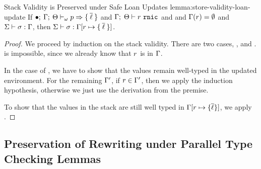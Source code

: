 \begin{oxlemma}{Stack Validity is Preserved under Safe Loan Updates}
  {lemma:store-validity-loan-update} If
  $\bullet; \: \Gamma; \: \Theta \vdash_{\omega} p \Rightarrow 
    \{ \: \overline{\ell} \: \} $ and
  $\Gamma; \; \Theta \vdash r \ \mathtt{rnic}$ and
  and $\Gamma(r) = \emptyset$ and
  $\Sigma \vdash \sigma : \Gamma$, then
  $\Sigma \vdash \sigma :  \Gamma [
      r \mapsto \{ \: \overline{\ell} \: \} ] $.
\end{oxlemma}

\begin{proof}
  We proceed by induction on the stack validity. There are two cases,
  , and .  is
  impossible, since we already know that $r$ is in $\Gamma$.

  \vspace{1em}
  \noindent \framebox[\textwidth]{ \figuresize
    \begin{mathpar}
      \VStack\and \VStackEmpty
    \end{mathpar}
  } \vspace{1em}

  In the case of , we have to show that the
  values remain well-typed in the updated environment. For the remaining
  $\Gamma^\prime$, if $r \in \Gamma^\prime$, then we apply the
  induction hypothesis, otherwise we just use the derivation from the premise.

  To show that the values in the stack are still well typed in
  $\Gamma[r \mapsto \{\overline{\ell}\}]$, we apply
  .
\end{proof}

\subsection{Preservation of Rewriting under Parallel Type Checking Lemmas}
\label{sec:parallel-lemmas}

